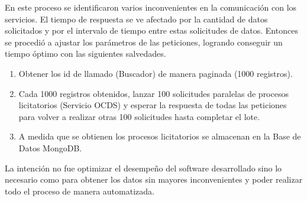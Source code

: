 En este proceso se identificaron varios inconvenientes en la comunicación con los servicios. El tiempo de respuesta se ve afectado por la cantidad de datos solicitados y por el intervalo de tiempo entre estas solicitudes de datos. Entonces se procedió a ajustar los parámetros de las peticiones, logrando conseguir un tiempo óptimo con las siguientes salvedades.

\begin{enumerate}

    \item Obtener los id de llamado (Buscador) de manera paginada (1000 registros).
    \item Cada 1000 registros obtenidos, lanzar 100 solicitudes paralelas de procesos licitatorios (Servicio OCDS) y esperar la respuesta de todas las peticiones para volver a realizar otras 100 solicitudes hasta completar el lote.
    \item A medida que se obtienen los procesos licitatorios se almacenan en la Base de Datos MongoDB.
  
\end{enumerate}

La intención no fue optimizar el desempeño del software desarrollado sino lo necesario como para obtener los datos sin mayores inconvenientes y poder realizar todo el proceso de manera automatizada.


